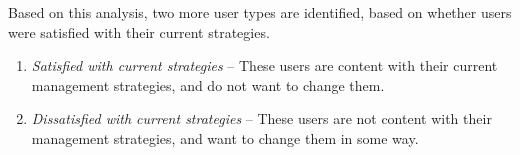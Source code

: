 Based on this analysis, two more user types are identified, based on whether users were satisfied with their current strategies.

\begin{enumerate}
\item \textit{Satisfied with current strategies} -- These users are content with their current management strategies, and do not want to change them. %

\item \textit{Dissatisfied with current strategies} -- These users are not content with their management strategies, and want to change them in some way.  %


\end{enumerate}


 

